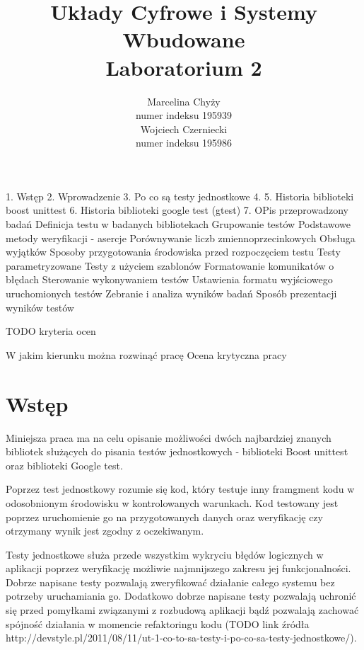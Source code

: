 \documentclass[12pt,a4paper,notitlepage]{report}
\author{Marcelina Chyży\\numer indeksu 195939\\Wojciech Czerniecki\\numer indeksu 195986}
\title{Układy Cyfrowe i Systemy Wbudowane \\ \small Laboratorium 2}
\makeatletter
\newcommand{\linia}{\rule{\linewidth}{0.4mm}}
\renewcommand{\maketitle}{
	\begin{titlepage}
		\vspace*{1cm}
		\begin{center}\small
			Politechnika Wrocławksa\\
			Wydział Elektorniki
		\end{center}
		\vspace{3cm}
		\noindent
		\linia
		\begin{center}
			\LARGE \textsc{\@title}
		\end{center}
		\linia
		\vspace{5.5cm}
		\begin{flushright}
			\begin{minipage}{5cm}
				\textit{\small Autorzy:}\\
				\normalsize \textsc{\@author} \par
			\end{minipage}
		\end{flushright}
		\vspace*{\stretch{6}}
		\begin{center}
			\@date
		\end{center}
	\end{titlepage}%
}
\makeatother
\begin{document}
	
	
	\newpage\thispagestyle{empty}
	\mbox{}
	
	\tableofcontents
	
	\renewcommand*\sectionmark[1]{\markboth{#1}{}}
	\renewcommand*\subsectionmark[1]{\markright{#1}}
	
1. Wstęp
2. Wprowadzenie
3. Po co są testy jednostkowe
4. 
5. Historia biblioteki boost unittest
6. Historia biblioteki google test (gtest)
7. OPis przeprowadzony badań
Definicja testu w badanych bibliotekach
Grupowanie testów
Podstawowe metody weryfikacji - asercje
Porównywanie liczb zmiennoprzecinkowych
Obsługa wyjątków
Sposoby przygotowania środowiska przed rozpoczęciem testu
Testy parametryzowane
Testy z użyciem szablonów
Formatowanie komunikatów o błędach
Sterowanie wykonywaniem testów
Ustawienia formatu wyjściowego uruchomionych testów
Zebranie i analiza wyników badań
Sposób prezentacji wyników testów

TODO kryteria ocen

W jakim kierunku można rozwinąć pracę
Ocena krytyczna pracy

\chapter{Wstęp}

Miniejsza praca ma na celu opisanie możliwości dwóch najbardziej znanych bibliotek służących do pisania testów jednostkowych - biblioteki Boost unittest oraz biblioteki Google test.

Poprzez test jednostkowy rozumie się kod, który testuje inny framgment kodu w odosobnionym środowisku w kontrolowanych warunkach. Kod testowany jest poprzez uruchomienie go na przygotowanych danych oraz weryfikację czy otrzymany wynik jest zgodny z oczekiwanym.

Testy jednostkowe służa przede wszystkim wykryciu błędów logicznych w aplikacji poprzez weryfikację możliwie najmnijszego zakresu jej funkcjonalności. Dobrze napisane testy pozwalają zweryfikować działanie całego systemu bez potrzeby uruchamiania go. Dodatkowo dobrze napisane testy pozwalają uchronić się przed pomyłkami związanymi z rozbudową aplikacji bądź pozwalają zachować spójność działania w momencie refaktoringu kodu (TODO link źródła http://devstyle.pl/2011/08/11/ut-1-co-to-sa-testy-i-po-co-sa-testy-jednostkowe/).
\end{document}
